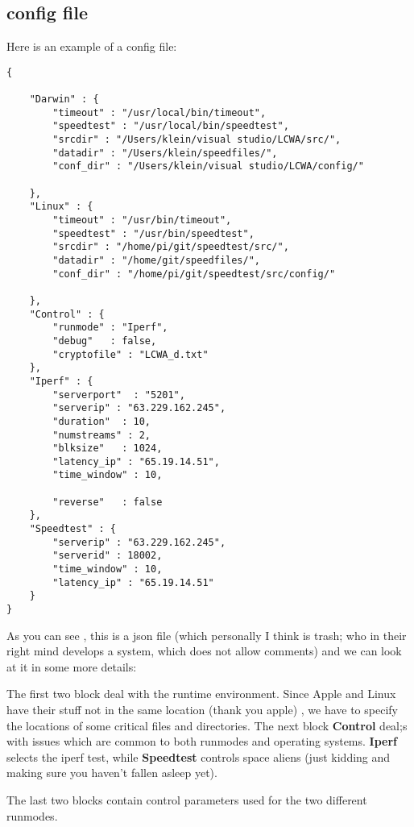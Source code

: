 \documentclass[12pt]{article}
\begin{document}
\subsection{config file}
Here is an example of a config file:
\begin{verbatim}
{

    "Darwin" : {
        "timeout" : "/usr/local/bin/timeout",
        "speedtest" : "/usr/local/bin/speedtest",
        "srcdir" : "/Users/klein/visual studio/LCWA/src/",
        "datadir" : "/Users/klein/speedfiles/",
        "conf_dir" : "/Users/klein/visual studio/LCWA/config/"

    },
    "Linux" : {
        "timeout" : "/usr/bin/timeout",
        "speedtest" : "/usr/bin/speedtest",
        "srcdir" : "/home/pi/git/speedtest/src/",
        "datadir" : "/home/git/speedfiles/",
        "conf_dir" : "/home/pi/git/speedtest/src/config/"

    },
    "Control" : {
        "runmode" : "Iperf",
        "debug"   : false,
        "cryptofile" : "LCWA_d.txt"
    },
    "Iperf" : {
        "serverport"  : "5201",
        "serverip" : "63.229.162.245",
        "duration"  : 10,
        "numstreams" : 2,
        "blksize"   : 1024,
        "latency_ip" : "65.19.14.51",
        "time_window" : 10,

        "reverse"   : false
    },
    "Speedtest" : {
        "serverip" : "63.229.162.245",
        "serverid" : 18002,
        "time_window" : 10,
        "latency_ip" : "65.19.14.51" 
    }
}

\end{verbatim}

As you can see , this is a json file (which personally I think is trash; who in their right mind develops a system, which does not allow comments) and we can look at it in some more details:

The first two block deal with the runtime environment. Since Apple and Linux have their stuff not in the same location (thank you apple) , we have to specify the locations of some critical files and directories. The next block \textbf{Control} deal;s with issues which are common to both runmodes and operating systems. \textbf{Iperf} selects the iperf test, while \textbf{Speedtest} controls space aliens (just kidding and making sure you haven't fallen asleep yet).

The last two blocks contain control parameters used for the two different runmodes.






\end{document}

